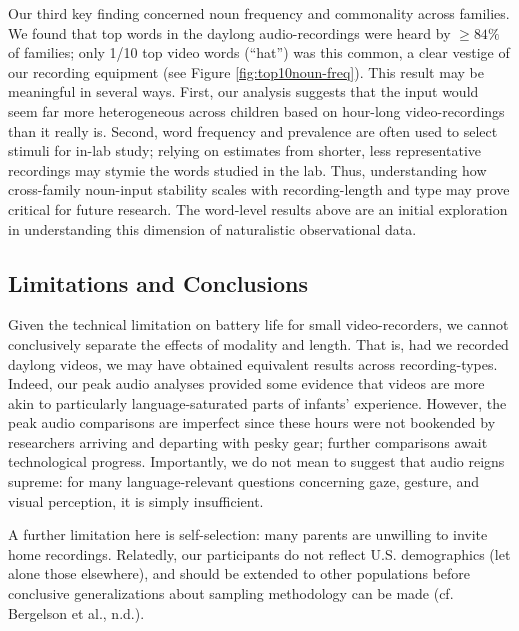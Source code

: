 \documentclass[man]{apa6}
\theoremstyle{definition}
\theoremstyle{definition}
\theoremstyle{definition}
\theoremstyle{remark}
\begin{document}
Our third key finding concerned noun frequency and commonality across
families. We found that top words in the daylong audio-recordings were
heard by \(\geq84\%\) of families; only 1/10 top video words
(\enquote{hat}) was this common, a clear vestige of our recording
equipment (see Figure \ref{fig:top10noun-freq}). This result may be
meaningful in several ways. First, our analysis suggests that the input
would seem far more heterogeneous across children based on hour-long
video-recordings than it really is. Second, word frequency and
prevalence are often used to select stimuli for in-lab study; relying on
estimates from shorter, less representative recordings may stymie the
words studied in the lab. Thus, understanding how cross-family
noun-input stability scales with recording-length and type may prove
critical for future research. The word-level results above are an
initial exploration in understanding this dimension of naturalistic
observational data.

\hypertarget{limitations-and-conclusions}{%
\subsection{Limitations and
Conclusions}\label{limitations-and-conclusions}}

Given the technical limitation on battery life for small
video-recorders, we cannot conclusively separate the effects of modality
and length. That is, had we recorded daylong videos, we may have
obtained equivalent results across recording-types. Indeed, our peak
audio analyses provided some evidence that videos are more akin to
particularly language-saturated parts of infants' experience. However,
the peak audio comparisons are imperfect since these hours were not
bookended by researchers arriving and departing with pesky gear; further
comparisons await technological progress. Importantly, we do not mean to
suggest that audio reigns supreme: for many language-relevant questions
concerning gaze, gesture, and visual perception, it is simply
insufficient.

A further limitation here is self-selection: many parents are unwilling
to invite home recordings. Relatedly, our participants do not reflect
U.S. demographics (let alone those elsewhere), and should be extended to
other populations before conclusive generalizations about sampling
methodology can be made (cf. Bergelson et al., n.d.).
\end{document}
